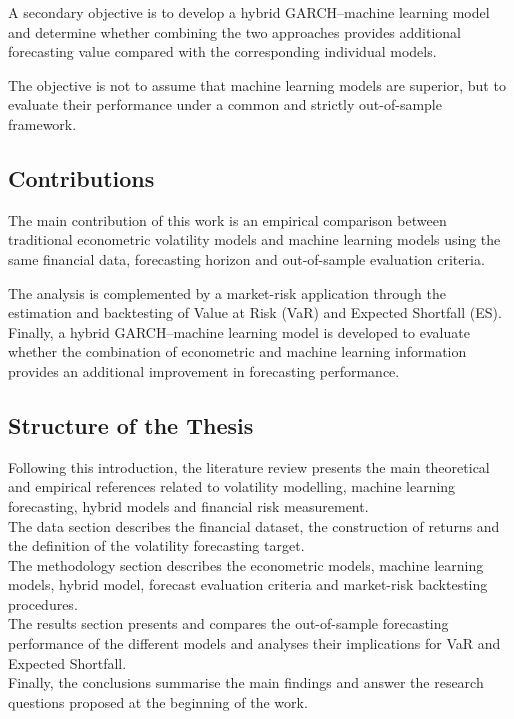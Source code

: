 \documentclass[12pt,a4paper]{article}
\begin{document}
A secondary objective is to develop a hybrid GARCH--machine learning model and determine whether
combining the two approaches provides additional forecasting value compared with the corresponding
individual models.

The objective is not to assume that machine learning models are superior, but to evaluate their
performance under a common and strictly out-of-sample framework.
\subsection{Contributions}
The main contribution of this work is an empirical comparison between traditional econometric
volatility models and machine learning models using the same financial data, forecasting horizon
and out-of-sample evaluation criteria.

The analysis is complemented by a market-risk application through the estimation and backtesting
of Value at Risk (VaR) and Expected Shortfall (ES). Finally, a hybrid GARCH--machine learning model
is developed to evaluate whether the combination of econometric and machine learning information
provides an additional improvement in forecasting performance.
\subsection{Structure of the Thesis}
Following this introduction, the literature review presents the main theoretical and empirical
references related to volatility modelling, machine learning forecasting, hybrid models and
financial risk measurement.\\
The data section describes the financial dataset, the construction of returns and the definition of the volatility forecasting target.\\
The methodology section describes the econometric models, machine learning models, hybrid model, forecast evaluation criteria and market-risk backtesting procedures.\\
The results section presents and compares the out-of-sample forecasting performance of the different models and analyses their implications for VaR and Expected Shortfall.\\
Finally, the conclusions summarise the main findings and answer the research questions proposed at the beginning of the work.
\end{document}
